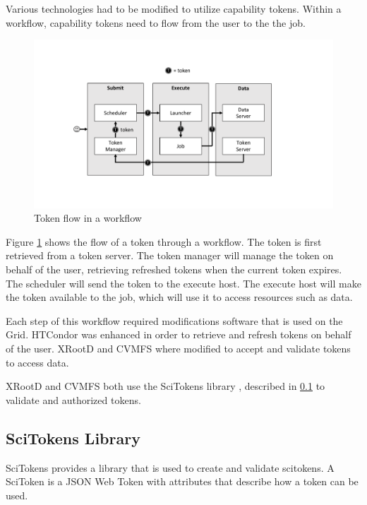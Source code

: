 \documentclass{webofc}
\begin{document}
Various technologies had to be modified to utilize capability tokens.  Within a workflow, capability tokens need to flow from the user to the the job.  

\begin{figure}[ht]
\includegraphics[width=\textwidth]{images/SciTokensFlow.pdf}
\caption{Token flow in a workflow}
\label{fig:tokenflow}
\end{figure}

Figure \ref{fig:tokenflow} shows the flow of a token through a workflow.  The token is first retrieved from a token server.  The token manager will manage the token on behalf of the user, retrieving refreshed tokens when the current token expires.  The scheduler will send the token to the execute host.  The execute host will make the token available to the job, which will use it to access resources such as data.

Each step of this workflow required modifications software that is used on the Grid.  HTCondor \cite{condor-practice} was enhanced in order to retrieve and refresh tokens on behalf of the user.  XRootD \cite{dorigo2005xrootd} and CVMFS \cite{buncic2010cernvm} where modified to accept and validate tokens to access data.

XRootD and CVMFS both use the SciTokens library \cite{scitokens-lib}, described in \ref{sec:scitokenslib} to validate and authorized tokens.


\subsection{SciTokens Library}
\label{sec:scitokenslib}
SciTokens \cite{withers2018scitokens} provides a library that is used to create and validate scitokens.  A SciToken is a JSON Web Token \cite{jones2015json} with attributes that describe how a token can be used.
\end{document}
